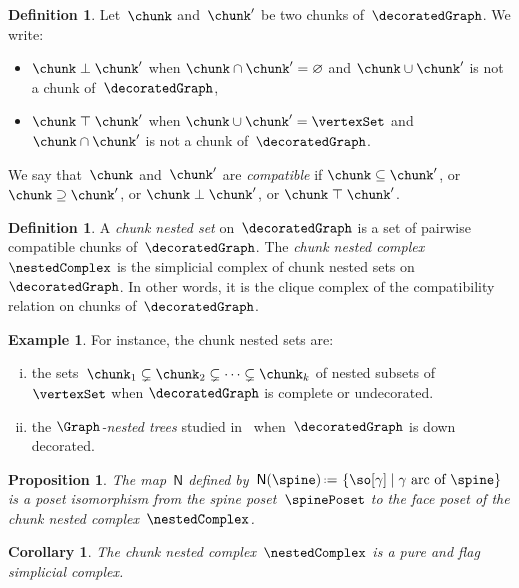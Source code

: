 \documentclass{amsart}
\newtheorem{corollary}[theorem]{Corollary}
\newtheorem{proposition}[theorem]{Proposition}
\theoremstyle{definition}
\newtheorem{definition}[theorem]{Definition}
\newtheorem{example}[theorem]{Example}
\newcommand{\set}[2]{\left\{ #1 \;\middle|\; #2 \right\}} %
\newcommand{\eqdef}{\mbox{\,\raisebox{0.2ex}{\scriptsize\ensuremath{\mathrm:}}\ensuremath{=}\,}} %
\newcommand{\darkblue}{\color{darkblue}} %
\newcommand{\defn}[1]{\textsl{\darkblue #1}} %
\newcommand{\negDisjoint}{\perp} %
\newcommand{\posDisjoint}{\;\top\;} %
\newcommand{\spineToNested}{\mathsf{N}} %
\begin{document}
\begin{definition}
  \label{def:compatibleBlocks}
  Let~$\chunk$ and~$\chunk'$ be two chunks of~$\decoratedGraph$.
  We write:
  \begin{itemize}
    \item $\chunk \negDisjoint \chunk'$ when $\chunk \cap \chunk' = \varnothing$ and $\chunk \cup \chunk'$ is not a chunk of~$\decoratedGraph$,
    \item $\chunk \posDisjoint \chunk'$ when $\chunk \cup \chunk' = \vertexSet$ and~$\chunk \cap \chunk'$ is not a chunk of~$\decoratedGraph$.
  \end{itemize}
  We say that~$\chunk$ and~$\chunk'$ are \defn{compatible} if $\chunk \subseteq \chunk'$, or $\chunk \supseteq \chunk'$, or $\chunk \negDisjoint \chunk'$, or $\chunk \posDisjoint \chunk'$.
\end{definition}

\begin{definition}
  \label{def:nestedComplex}
  A \defn{chunk nested set} on~$\decoratedGraph$ is a set of pairwise compatible chunks of~$\decoratedGraph$.
  The \defn{chunk nested complex}~$\nestedComplex$ is the simplicial complex of chunk nested sets on~$\decoratedGraph$.
  In other words, it is the clique complex of the compatibility relation on chunks of~$\decoratedGraph$.
\end{definition}

\begin{example}
  \label{exm:nestedComplex}
  For instance, the chunk nested sets are:
  \begin{enumerate}[(i)]
    \item the sets~$\chunk_1 \subsetneq \chunk_2 \subsetneq \dots \subsetneq \chunk_k$ of nested subsets of~$\vertexSet$ when $\decoratedGraph$ is complete or undecorated.
    \item the \defn{$\Graph$-nested trees} studied in~\cite{CarrDevadoss} when~$\decoratedGraph$ is down decorated.
  \end{enumerate}
\end{example}

\begin{proposition}
  \label{prop:spineToNested}
  The map~$\spineToNested$ defined by~$\spineToNested(\spine) \eqdef \set{\so[\gamma]}{\gamma \text{ arc of } \spine}$ is a poset isomorphism from the spine poset~$\spinePoset$ to the face poset of the chunk nested complex~$\nestedComplex$.
\end{proposition}

\begin{corollary}
  The chunk nested complex~$\nestedComplex$ is a pure and flag simplicial complex.
\end{corollary}
\end{document}
